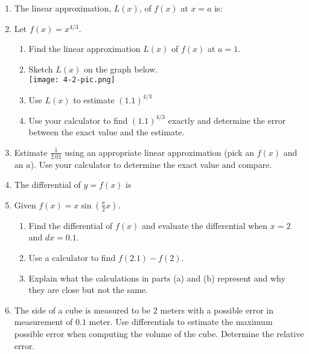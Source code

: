 \documentclass[11pt,fleqn]{article}
\begin{document}
\setlength{\parindent}{0cm}
\renewcommand{\headrulewidth}{0pt}
\newcommand{\blank}[1]{\rule{#1}{0.75pt}}
\renewcommand{\d}{\displaystyle}
\vspace*{-0.7in}
\begin{center}
 {\large{ }}
\end{center}
 \begin{enumerate}
 \item The linear approximation, $L(x)$, of $f(x)$ at $x=a$ is: 
 \vspace{.5in}
 \item Let $f(x)=x^{4/3}.$ 
 	\begin{enumerate}
	\item Find the linear approximation $L(x)$ of $f(x)$ at $a=1.$
	\vfill
	\item Sketch $L(x)$ on the graph below.\\
	\texttt{[image: 4-2-pic.png]}
	
	\item Use $L(x)$ to estimate $(1.1)^{4/3}$
	\vfill
	\item Use your calculator to find $(1.1)^{4/3}$ exactly and determine the error between the exact value and the estimate.
	\vfill
	\end{enumerate}
\item Estimate $\frac{1}{2.01}$ using an appropriate linear approximation (pick an $f(x)$ and an $a$). Use your calculator to determine the exact value and compare.\vfill
\newpage
\item The differential of $y=f(x)$ is 
\vspace{.5in}
\item Given $f(x)=x \sin( \frac{\pi}{2} x)$. 
	\begin{enumerate}
	\item Find the differential of $f(x)$ and evaluate the differential when $x=2$ and $dx=0.1.$
	\vfill
	\item Use a calculator to find $f(2.1)-f(2).$
	\vfill
	\item Explain what the calculations in parts (a) and (b) represent and why they are close but not the same.
	\vfill
	\end{enumerate}
\item The side of a cube is measured to be 2 meters with a possible error in measurement of $0.1$ meter. Use differentials to estimate the maximum possible error when computing the volume of the cube. Determine the relative error.
\vfill
\end{enumerate}
\end{document}
